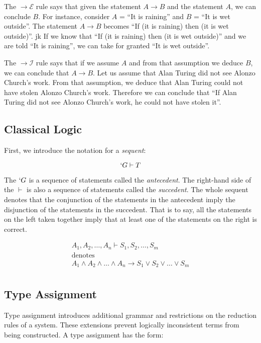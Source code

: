   The $\to\mathcal{E}$ rule says that given the statement $A \to B$ and the statement $A$,
  we can conclude $B$.
  For instance, 
  consider $A$ = ``It is raining''
  and $B$ = ``It is wet outside''.
  The statement $A \to B$ becomes ``If (it is raining) then (it is wet outside)''.
jk  If we know that ``If (it is raining) then (it is wet outside)'' and we are told ``It is raining'',
  we can take for granted ``It is wet outside''.
  
  The $\to\mathcal{I}$ rule says that if we assume $A$ and from that assumption we deduce $B$,
  we can conclude that $A \to B$.
  Let us assume that Alan Turing did not see Alonzo Church's work.
  From that assumption, we deduce that Alan Turing could not have stolen Alonzo Church's work.
  Therefore we can conclude that ``If Alan Turing did not see Alonzo Church's work, he could not have stolen it''. 
  
  \subsection{Classical Logic}
  
  
  First, we introduce the notation for a \emph{sequent}:
  
    \[
      `G \vdash T
    \]
    
  The $`G$ is a sequence of statements called the \emph{antecedent}.
  The right-hand side of the $\vdash$ is also a sequence of statements called the \emph{succedent}.
  The whole sequent denotes that the conjunction of the statements in the antecedent imply the disjunction of the statements in the succedent.
  That is to say, all the statements on the left taken together imply that at least one of the statements on the right is correct.
  
  \[
    \begin{array}{c}
    A_1,A_2,\dots,A_n \vdash S_1,S_2,\dots,S_m \\
      \text{denotes} \\
    A_1 \wedge A_2 \wedge \ldots \wedge A_n \to S_1 \lor S_2 \lor \dots \lor S_m \\
    \end{array}
  \]
 

  \subsection{Type Assignment}
  
  Type assignment introduces additional grammar and restrictions on
  the reduction rules of a system. These extensions prevent logically
  inconsistent terms from being constructed. A type assignment has the
  form:
  
